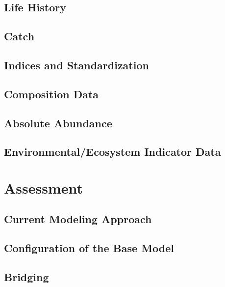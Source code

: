 \documentclass[
  letterpaper,
]{article}
\begin{document}
\subsection{Life History}\label{life-history}

\subsection{Catch}\label{catch}

\subsection{Indices and
Standardization}\label{indices-and-standardization}

\subsection{Composition Data}\label{composition-data}

\subsection{Absolute Abundance}\label{absolute-abundance}

\subsection{Environmental/Ecosystem Indicator
Data}\label{environmentalecosystem-indicator-data}

\newpage{}

\section{Assessment}\label{sec-assmt-config}

\subsection{Current Modeling Approach}\label{current-modeling-approach}

\subsection{Configuration of the Base
Model}\label{configuration-of-the-base-model}

\subsection{Bridging}\label{bridging}
\end{document}
